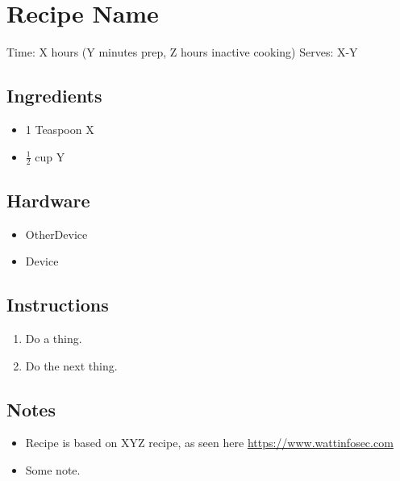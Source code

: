 \section{Recipe Name}
\label{recipeName}
\setcounter{secnumdepth}{0}
Time: X hours (Y minutes prep, Z hours inactive cooking)
Serves: X-Y

\begin{multicols}{2}
\subsection*{Ingredients}
\begin{itemize}
    \item 1 Teaspoon X
    \item \( \frac{1}{2} \) cup Y
\end{itemize}

\subsection*{Hardware}
\begin{itemize}
    \item OtherDevice
    \item Device
\end{itemize}
\clearpage

\subsection*{Instructions}
\begin{enumerate}
    \item Do a thing.
    \item Do the next thing.
\end{enumerate}

\subsection*{Notes}
\begin{itemize}
    \item Recipe is based on XYZ recipe, as seen here \url{https://www.wattinfosec.com}
    \item Some note.
\end{itemize}
\end{multicols}
\clearpage